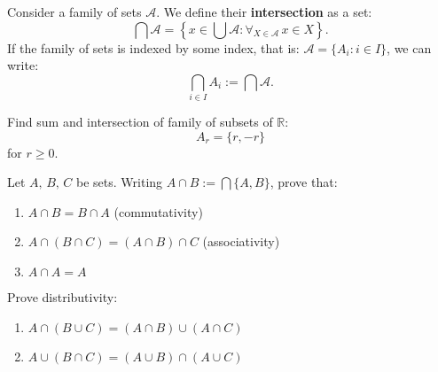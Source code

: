 \begin{definition}
  Consider a family of sets $\mathcal A$. We define their \textbf{intersection} as a set:
  $$\bigcap \mathcal A = \left\{x\in \bigcup \mathcal A : \forall_{X\in\mathcal A}\, x\in X\right\}.$$
  If the family of sets is indexed by some index, that is: $\mathcal A = \{A_i : i\in I\}$, we can write:
  $$\bigcap_{i\in I} A_i := \bigcap \mathcal A.$$
\end{definition}

\begin{exercise}
	Find sum and intersection of family of subsets of $\mathbb R$:
  $$A_r=\{r, -r\}$$ for $r\ge 0.$
\end{exercise}

\begin{exercise}
	Let $A,\,B,\,C$ be sets. Writing $A\cap B := \bigcap \{A,B\}$, prove that:
	\begin{enumerate}
		\item $A\cap B=B\cap A$ (commutativity)
		\item $A\cap (B\cap C)=(A\cap B)\cap C$ (associativity)
    \item $A\cap A=A$
	\end{enumerate}
\end{exercise}

\begin{exercise}
  Prove distributivity:
  \begin{enumerate}
    \item $A\cap (B\cup C)=(A\cap B)\cup (A\cap C)$
    \item $A\cup (B\cap C)=(A\cup B)\cap (A\cup C)$
  \end{enumerate}
\end{exercise}

%

